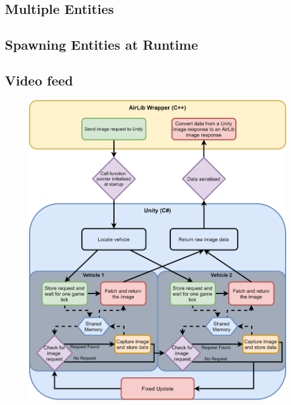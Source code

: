 \subsection{Multiple Entities}

\subsection{Spawning Entities at Runtime}

\subsection{Video feed} \label{06:VideoFeed}

\begin{figure}[h]
    \centering
    \includegraphics[width=1.0\textwidth]{06_Implementation/00_AirSim/Diagrams/imagecapture.png}
    \caption{} \label{06:imageCapture}
\end{figure}

